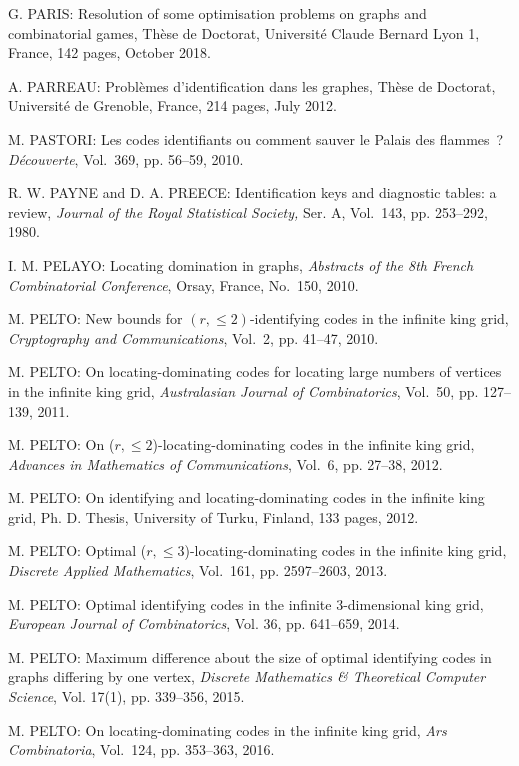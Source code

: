 \begin{thebibliography}{999}
G. PARIS: Resolution of some optimisation problems on graphs and combinatorial games, Th\`ese de Doctorat, Universit\'e Claude Bernard Lyon 1, France, 142 pages, October 2018.

A. PARREAU: Probl\`emes d'identification dans les graphes, Th\`ese de Doctorat, Universit\'e de Grenoble, France, 214 pages, July 2012.

M. PASTORI: Les codes identifiants ou comment sauver le Palais des flammes~? {\it D\'ecouverte}, Vol.~369, pp. 56--59, 2010.

R. W. PAYNE and D. A. PREECE: Identification keys and diagnostic tables: a review, {\it Journal of the Royal Statistical Society,} Ser. A, Vol.~143, pp. 253--292, 1980.

I. M. PELAYO: Locating domination in graphs, {\it Abstracts of the 8th French Combinatorial Conference}, Orsay, France, No.~150, 2010.

M. PELTO: New bounds for $(r,\leq 2)$-identifying codes in the infinite king grid, {\it Cryptography and Communications}, Vol.~2, pp. 41--47, 2010.

M. PELTO: On locating-dominating codes for locating large numbers of vertices in the infinite king grid, {\it Australasian Journal of Combinatorics}, Vol.~50, pp. 127--139, 2011.

M. PELTO: On ($r, \leq 2$)-locating-dominating codes in the infinite king grid, {\it Advances in Mathematics of Communications}, Vol.~6, pp. 27--38, 2012.

M. PELTO: On identifying and locating-dominating codes in the infinite king grid, Ph. D. Thesis, University of Turku, Finland, 133 pages, 2012.

M. PELTO: Optimal ($r, \leq 3$)-locating-dominating codes in the infinite king grid, {\it Discrete Applied Mathematics}, Vol.~161, pp. 2597--2603, 2013.

M. PELTO: Optimal identifying codes in the infinite $3$-dimensional king grid, {\it European Journal of Combinatorics}, Vol. 36, pp. 641--659, 2014.

M. PELTO: Maximum difference about the size of optimal identifying codes in graphs differing by one vertex, {\it Discrete Mathematics \& Theoretical Computer Science}, Vol. 17(1), pp. 339--356, 2015.

M. PELTO: On locating-dominating codes in the infinite king grid, {\it Ars Combinatoria}, Vol.~124, pp. 353--363, 2016.


\end{thebibliography}

